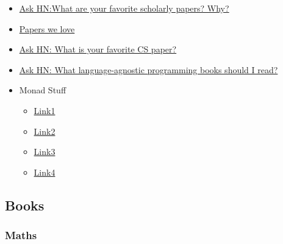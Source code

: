 \begin{itemize}
	
	\item \href{files/Ask HN_ What are your favorite scholarly papers_ Why_ _ Hacker News.pdf}{Ask HN:What are your favorite scholarly papers? Why?}
	
	\item \href{https://github.com/papers-we-love/papers-we-love}{Papers we
		love}

	\item \href{files/Ask HN_ What is your favorite CS paper_ _ Hacker News.pdf}{Ask HN: What is your favorite CS paper?}

	\item \href{files/Ask HN_ What language-agnostic programming books should I read_ _ Hacker News.pdf}{Ask HN: What language-agnostic programming books should I read?}

	\item Monad Stuff

	\begin{itemize}
		\item
		\href{http://bartoszmilewski.com/2015/05/11/using-monads-in-c-to-solve-constraints-1-the-list-monad/}{Link1}
		\item
		\href{http://blog.jle.im/entry/unique-sample-drawing-searches-with-list-and-statet}{Link2}
		\item
		\href{http://www.berniepope.id.au/docs/scala_monads.pdf}{Link3}
		\item
		\href{http://james-iry.blogspot.co.at/2007/10/monads-are-elephants-part-3.html}{Link4}
	\end{itemize}

\end{itemize}

\subsection{Books}

\subsubsection{Maths}

